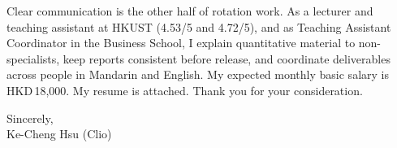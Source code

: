 \documentclass[11pt,letterpaper]{article}
\begin{document}
Clear communication is the other half of rotation work. As a lecturer and teaching assistant at HKUST (4.53/5 and 4.72/5), and as Teaching Assistant Coordinator in the Business School, I explain quantitative material to non-specialists, keep reports consistent before release, and coordinate deliverables across people in Mandarin and English. My expected monthly basic salary is HKD\,18,000. My resume is attached. Thank you for your consideration.

\vspace{0.4em}
Sincerely,\\[0.35em]
Ke-Cheng Hsu (Clio)
\end{document}
